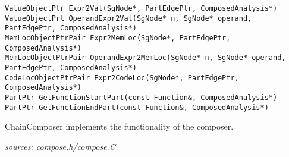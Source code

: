\documentclass{article}
\begin{document}
\begin{lstlisting}
ValueObjectPtr Expr2Val(SgNode*, PartEdgePtr, ComposedAnalysis*)
ValueObjectPrt OperandExpr2Val(SgNode* n, SgNode* operand, PartEdgePtr, ComposedAnalysis*)
MemLocObjectPtrPair Expr2MemLoc(SgNode*, PartEdgePtr, ComposedAnalysis*)
MemLocObjectPtrPair OperandExpr2MemLoc(SgNode* n, SgNode* operand, PartEdgePtr, ComposedAnalysis*)
CodeLocObjectPtrPair Expr2CodeLoc(SgNode*, PartEdgePtr, ComposedAnalysis*)
PartPtr GetFunctionStartPart(const Function&, ComposedAnalysis*)
PartPtr GetFunctionEndPart(const Function&, ComposedAnalysis*)
\end{lstlisting}

ChainComposer implements the functionality of the composer.

\emph{sources: compose.h/compose.C}
\end{document}
